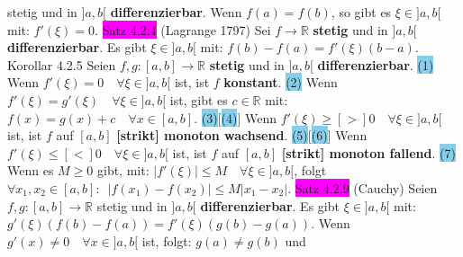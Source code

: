 \documentclass[landscape, 10pt]{article}
\newcommand{\R}{\mathbb{R}}
\begin{document}
\begin{multicols}{3}
                stetig und in \textcolor{NavyBlue}{$]a,b[$} \textbf{differenzierbar}. 
                Wenn \textcolor{NavyBlue}{$f(a)=f(b)$}, so gibt es 
         \textcolor{NavyBlue}{$\xi\in]a,b[$} mit: 
                \textcolor{NavyBlue}{$f'(\xi)=0$}.
\colorbox{magenta}{Satz 4.2.4} (Lagrange 1797) Sei 
                \textcolor{NavyBlue}{$f\longrightarrow\R$}
                \textbf{stetig} und in \textcolor{NavyBlue}{$]a,b[$} 
                \textbf{differenzierbar}. 
                Es gibt \textcolor{NavyBlue}{$\xi\in]a,b[$} mit: 
         \textcolor{NavyBlue}{$f(b)-f(a)=f'(\xi)(b-a)$}.
\colorbox{BurntOrange}{Korollar 4.2.5} Seien 
                \textcolor{NavyBlue}{$f,g:[a,b]\longrightarrow\R$}
                \textbf{stetig} und in \textcolor{NavyBlue}{$]a,b[$} 
                \textbf{differenzierbar}.
         \colorbox{SkyBlue}{(1)} Wenn 
                \textcolor{NavyBlue}{$f'(\xi)=0\quad\forall\xi\in]a,b[$} ist, 
                ist \textcolor{NavyBlue}{$f$} \textbf{konstant}. 
         \colorbox{SkyBlue}{(2)} Wenn 
                \textcolor{NavyBlue}{$f'(\xi)=g'(\xi)\quad\forall\xi\in]a,b[$} ist, 
                gibt es \textcolor{NavyBlue}{$c\in\R$} mit: 
                \textcolor{NavyBlue}{$f(x)=g(x)+c\quad\forall x\in[a,b]$}. 
         \colorbox{SkyBlue}{(3)}[\colorbox{SkyBlue}{(4)}] 
                Wenn \textcolor{NavyBlue}{$f'(\xi)\geqslant[>]0\quad\forall\xi\in]a,b[$} ist, 
                ist \textcolor{NavyBlue}{$f$} auf \textcolor{NavyBlue}{$[a,b]$} 
                \textbf{[strikt] monoton wachsend}. 
         \colorbox{SkyBlue}{(5)}[\colorbox{SkyBlue}{(6)}] 
                Wenn \textcolor{NavyBlue}{$f'(\xi)\leqslant[<]0\quad\forall\xi\in]a,b[$} ist, 
                ist \textcolor{NavyBlue}{$f$} auf \textcolor{NavyBlue}{$[a,b]$} 
                \textbf{[strikt] monoton fallend}. 
         \colorbox{SkyBlue}{(7)} Wenn es \textcolor{NavyBlue}{$M\geqslant0$} gibt, mit: 
                \textcolor{NavyBlue}{$|f'(\xi)|\leqslant M\quad\forall\xi\in]a,b[$}, 
                folgt \textcolor{NavyBlue}{ 
                $\forall x_1,x_2\in[a,b]:\enspace|f(x_1)-f(x_2)|\leqslant M|x_1-x_2|$}. 
\colorbox{magenta}{Satz 4.2.9} (Cauchy) Seien 
                \textcolor{NavyBlue}{$f,g:[a,b]\longrightarrow\R$}
                stetig und in \textcolor{NavyBlue}{$]a,b[$} \textbf{differenzierbar}.
                Es gibt \textcolor{NavyBlue}{$\xi\in]a,b[$} mit: 
         \textcolor{NavyBlue}{$g'(\xi)(f(b)-f(a))=f'(\xi)(g(b)-g(a))$}. 
                Wenn \textcolor{NavyBlue}{$g'(x)\neq0\quad\forall x\in]a,b[$} 
                ist, folgt: \textcolor{NavyBlue}{$g(a)\neq g(b)$} und 

\end{multicols}
\end{document}

